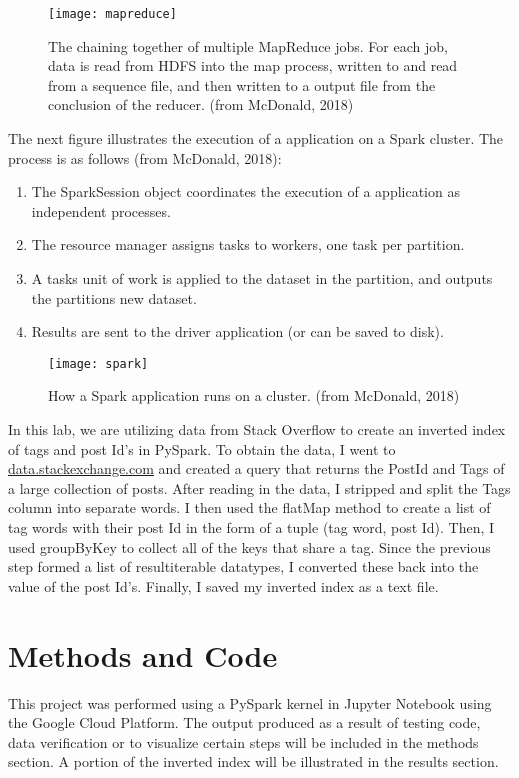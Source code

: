 \documentclass[]{article}
\begin{document}
\begin{figure}[!h]
	\texttt{[image: mapreduce]}
	\caption{The chaining together of multiple MapReduce jobs.  For each job, data is read from HDFS into the map process, written to and read from a sequence file, and then written to a output file from the conclusion of the reducer. (from McDonald, 2018)}
	\label{Fig:Race}
\end{figure}
The next figure illustrates the execution of a application on a Spark cluster.  The process is as follows (from McDonald, 2018):
\begin{enumerate}
	\item The SparkSession object coordinates the execution of a application as independent processes.
	\item The resource manager assigns tasks to workers, one task per partition.
	\item A tasks unit of work is applied to the dataset in the partition, and outputs the partitions new dataset.
	\item Results are sent to the driver application (or can be saved to disk).
\end{enumerate}
\begin{figure}[!h]
	\texttt{[image: spark]}
	\caption{How a Spark application runs on a cluster. (from McDonald, 2018)}
	\label{Fig:Race}
\end{figure}

In this lab, we are utilizing data from Stack Overflow to create an inverted index of tags and post Id's in PySpark.  To obtain the data, I went to \url{data.stackexchange.com} and created a query that returns the PostId and Tags of a large collection of posts.  After reading in the data, I stripped and split the Tags column into separate words.  I then used the flatMap method to create a list of tag words with their post Id in the form of a tuple (tag word, post Id).  Then, I used groupByKey to collect all of the keys that share a tag.  Since the previous step formed a list of resultiterable datatypes, I converted these back into the value of the post Id's.  Finally, I saved my inverted index as a text file.

\section{Methods and Code}

This project was performed using a PySpark kernel in Jupyter Notebook using the Google Cloud Platform.  The output produced as a result of testing code, data verification or to visualize certain steps will be included in the methods section.  A portion of the inverted index will be illustrated in the results section.
\end{document}
